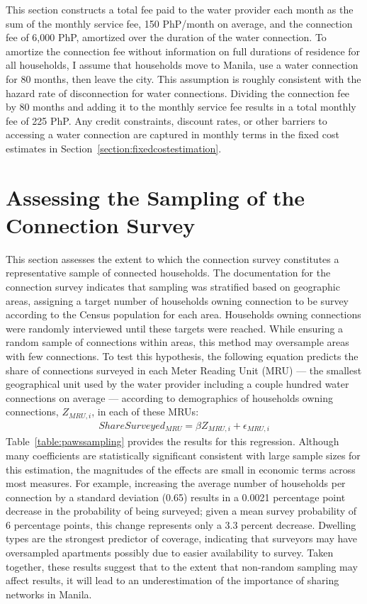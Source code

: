 \documentclass[12pt]{article}
\begin{document}
\begin{appendices}
This section constructs a total fee paid to the water provider each month as the sum of the monthly service fee, 150 PhP/month on average, and the connection fee of 6,000 PhP, amortized over the duration of the water connection.  To amortize the connection fee without information on full durations of residence for all households, I assume that households move to Manila, use a water connection for 80 months, then leave the city.  This assumption is roughly consistent with the hazard rate of disconnection for water connections.  Dividing the connection fee by 80 months and adding it to the monthly service fee results in a total monthly fee of 225 PhP.  Any credit constraints, discount rates, or other barriers to accessing a water connection are captured in monthly terms in the fixed cost estimates in Section~\ref{section:fixedcostestimation}.


\section{Assessing the Sampling of the Connection Survey}\label{appendix:pawssampling}

This section assesses the extent to which the connection survey constitutes a representative sample of connected households.  The documentation for the connection survey indicates that sampling was stratified based on geographic areas, assigning a target number of households owning connection to be survey according to the Census population for each area.  Households owning connections were randomly interviewed until these targets were reached.  While ensuring a random sample of connections within areas, this method may oversample areas with few connections.  To test this hypothesis, the following equation predicts the share of connections surveyed in each Meter Reading Unit (MRU) --- the smallest geographical unit used by the water provider including a couple hundred water connections on average --- according to demographics of households owning connections, $Z_{MRU,i}$, in each of these MRUs:
\begin{align*}
ShareSurveyed_{MRU} = \beta Z_{MRU,i} + \epsilon_{MRU,i}
\end{align*}
Table~\ref{table:pawssampling} provides the results for this regression.  Although many coefficients are statistically significant consistent with large sample sizes for this estimation, the magnitudes of the effects are small in economic terms across most measures.  For example, increasing the average number of households per connection by a standard deviation (0.65) results in a 0.0021 percentage point decrease in the probability of being surveyed; given a mean survey probability of 6 percentage points, this change represents only a 3.3 percent decrease.  Dwelling types are the strongest predictor of coverage, indicating that surveyors may have oversampled apartments possibly due to easier availability to survey.  Taken together, these results suggest that to the extent that non-random sampling may affect results, it will lead to an underestimation of the importance of sharing networks in Manila.


\end{appendices}
\end{document}
